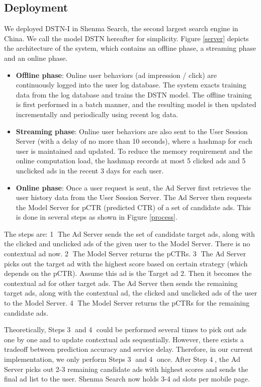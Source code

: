 \documentclass[sigconf]{acmart}
\begin{document}
\subsection{Deployment} \label{sec_deploy}
We deployed DSTN-I in Shenma Search, the second largest search engine in China. We call the model DSTN hereafter for simplicity. Figure \ref{server} depicts the architecture of the system, which contains an offline phase, a streaming phase and an online phase.
\begin{itemize}
\item \textbf{Offline phase}: Online user behaviors (ad impression / click) are continuously logged into the user log database. The system exacts training data from the log database and trains the DSTN model. The offline training is first performed in a batch manner, and the resulting model is then updated incrementally and periodically using recent log data.
\item \textbf{Streaming phase}: Online user behaviors are also sent to the User Session Server (with a delay of no more than 10 seconds), where a hashmap for each user is maintained and updated. To reduce the memory requirement and the online computation load, the hashmap records at most 5 clicked ads and 5 unclicked ads in the recent 3 days for each user.
\item \textbf{Online phase}: Once a user request is sent, the Ad Server first retrieves the user history data from the User Session Server. The Ad Server then requests the Model Server for pCTR (predicted CTR) of a set of candidate ads. This is done in several steps as shown in Figure \ref{process}.
\end{itemize}

The steps are: \textcircled{1} The Ad Server sends the set of candidate target ads, along with the clicked and unclicked ads of the given user to the Model Server. There is no contextual ad now. \textcircled{2} The Model Server returns the pCTRs. \textcircled{3} The Ad Server picks out the target ad with the highest score based on certain strategy (which depends on the pCTR). Assume this ad is the Target ad 2. Then it becomes the contextual ad for other target ads. The Ad Server then sends the remaining target ads, along with the contextual ad, the clicked and unclicked ads of the user to the Model Server. \textcircled{4} The Model Server returns the pCTRs for the remaining candidate ads.

Theoretically, Steps \textcircled{3} and \textcircled{4} could be performed several times to pick out ads one by one and to update contextual ads sequentially. However, there exists a tradeoff between prediction accuracy and service delay. Therefore, in our current implementation, we only perform Steps \textcircled{3} and \textcircled{4} once. After Step \textcircled{4}, the Ad Server picks out 2-3 remaining candidate ads with highest scores and sends the final ad list to the user. Shenma Search now holds 3-4 ad slots per mobile page.
\end{document}
